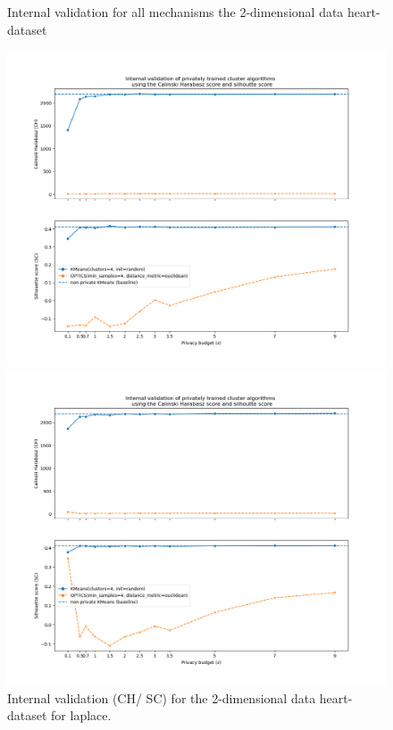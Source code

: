 \begin{figure}[H]
    \caption{Internal validation for all mechanisms the 2-dimensional data heart-dataset}
    \centering
    \begin{minipage}[c]{0.49\textwidth}
        \includegraphics[width=1\textwidth]{Results/2d-laplace/heart-dataset/ch-and-sc.png}
        \caption{Internal validation (CH/ SC) for the 2-dimensional data heart-dataset for laplace.}
        \label{fig:appendix-internal-validation-heart-dataset_comparison_2d-laplace}
    \end{minipage}
    \begin{minipage}[c]{0.49\textwidth}
        \includegraphics[width=1\textwidth]{Results/2d-laplace-truncated/heart-dataset/ch-and-sc.png}

\end{minipage}
\end{figure}
